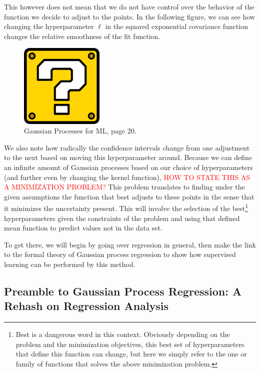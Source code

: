 This however does not mean that we do not have control over the behavior of the function we decide to adjust to the points. In the following figure, we can see how changing the hyperparameter $\ell$ in the squared exponential covariance function changes the relative smoothness of the fit function. 

\begin{figure}[h]
	\includegraphics[width=4cm]{Figures/missing.png}
	\centering
	\caption{Gaussian Processes for ML, page 20.}
	\label{trajectories}
\end{figure}

We also note how radically the confidence intervals change from one adjustment to the next based on moving this hyperparameter around. Because we can define an infinite amount of Gaussian processes based on our choice of hyperparameters (and further even by changing the kernel function), \textcolor{red}{HOW TO STATE THIS AS A MINIMIZATION PROBLEM?}
This problem translates to finding under the given assumptions the function that best adjusts to these points in the sense that it minimizes the uncertainty present. This will involve the selection of the best\footnote{Best is a dangerous word in this context. Obviously depending on the problem and the minimization objectives, this best set of hyperparameters that define this function can change, but here we simply refer to the one or family of functions that solves the above minimization problem.} hyperparameters given the constraints of the problem and using that defined mean function to predict values not in the data set.

To get there, we will begin by going over regression in general, then make the link to the formal theory of Gaussian process regression to show how supervised learning can be performed by this method. 

\subsection{Preamble to Gaussian Process Regression: A Rehash on Regression Analysis}


